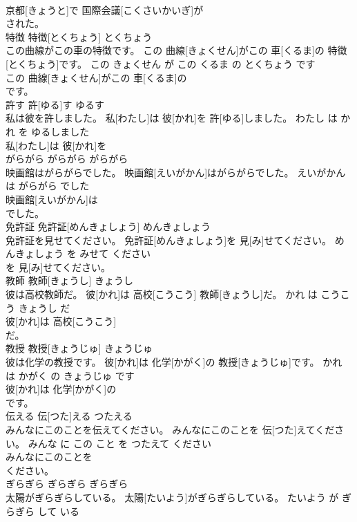 \documentclass[8pt]{extreport}
\begin{document}
\begin{CJK}{UTF8}{min}
\\	京都[きょうと]で 国際会議[こくさいかいぎ]が
\\	された。			
\\	特徴	特徴[とくちょう]	とくちょう	
\\	この曲線がこの車の特徴です。	この 曲線[きょくせん]がこの 車[くるま]の 特徴[とくちょう]です。	この きょくせん が この くるま の とくちょう です	
\\	この 曲線[きょくせん]がこの 車[くるま]の
\\	です。			
\\	許す	許[ゆる]す	ゆるす	
\\	私は彼を許しました。	私[わたし]は 彼[かれ]を 許[ゆる]しました。	わたし は かれ を ゆるしました	
\\	私[わたし]は 彼[かれ]を
\\	がらがら	がらがら	がらがら	
\\	映画館はがらがらでした。	映画館[えいがかん]はがらがらでした。	えいがかん は がらがら でした	
\\	映画館[えいがかん]は
\\	でした。			
\\	免許証	免許証[めんきょしょう]	めんきょしょう	
\\	免許証を見せてください。	免許証[めんきょしょう]を 見[み]せてください。	めんきょしょう を みせて ください	
\\	を 見[み]せてください。			
\\	教師	教師[きょうし]	きょうし	
\\	彼は高校教師だ。	彼[かれ]は 高校[こうこう] 教師[きょうし]だ。	かれ は こうこう きょうし だ	
\\	彼[かれ]は 高校[こうこう]
\\	だ。			
\\	教授	教授[きょうじゅ]	きょうじゅ	
\\	彼は化学の教授です。	彼[かれ]は 化学[かがく]の 教授[きょうじゅ]です。	かれ は かがく の きょうじゅ です	
\\	彼[かれ]は 化学[かがく]の
\\	です。			
\\	伝える	伝[つた]える	つたえる	
\\	みんなにこのことを伝えてください。	みんなにこのことを 伝[つた]えてください。	みんな に この こと を つたえて ください	
\\	みんなにこのことを
\\	ください。			
\\	ぎらぎら	ぎらぎら	ぎらぎら	
\\	太陽がぎらぎらしている。	太陽[たいよう]がぎらぎらしている。	たいよう が ぎらぎら して いる	

\end{CJK}
\end{document}
